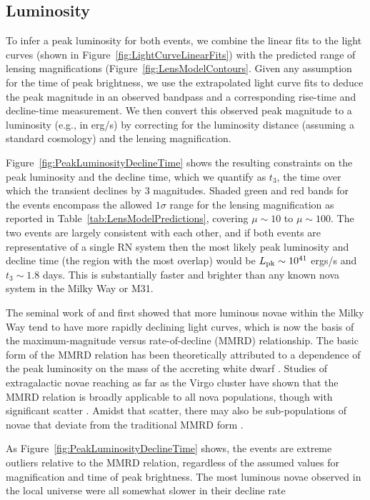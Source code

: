 \subsection{Luminosity}

To infer a peak luminosity for both \spock events, we combine the
linear fits to the light curves (shown in
Figure~\ref{fig:LightCurveLinearFits}) with the predicted range of
lensing magnifications (Figure~\ref{fig:LensModelContours}. Given any
assumption for the time of peak brightness, we use the extrapolated
light curve fits to deduce the peak magnitude in an observed bandpass
and a corresponding rise-time and decline-time measurement.  We then
convert this observed peak magnitude to a luminosity (e.g., in
erg/s) by correcting for the luminosity distance (assuming a standard
\LCDM cosmology) and the lensing magnification.

Figure~\ref{fig:PeakLuminosityDeclineTime} shows the resulting
constraints on the peak luminosity and the decline time, which we
quantify as $t_3$, the time over which the transient declines by 3
magnitudes.  Shaded green and red bands for the \spock events
encompass the allowed $1\sigma$ range for the lensing magnification as
reported in Table~\ref{tab:LensModelPredictions}, covering $\mu\sim10$
to $\mu\sim100$.  The two events are largely consistent with each
other, and if both events are representative of a single RN system
then the most likely peak luminosity and decline time (the region with
the most overlap) would be $L_{\rm pk}\sim10^{41}$ ergs/s and
$t_3\sim1.8$ days.  This is substantially faster and brighter than any
known nova system in the Milky Way or M31. 

The seminal work of \citet{Zwicky:1936} and \citet{McLaughlin:1939}
first showed that more luminous novae within the Milky Way tend to
have more rapidly declining light curves, which is now the basis of
the maximum-magnitude versus rate-of-decline (MMRD) relationship. The
basic form of the MMRD relation has been theoretically attributed to a
dependence of the peak luminosity on the mass of the accreting white
dwarf \citep[e.g.][]{Livio:1992}.  Studies of extragalactic novae
reaching as far as the Virgo cluster have shown that the MMRD relation
is broadly applicable to all nova populations, though with significant
scatter
\citep[e.g.][]{Ciardullo:1990,DellaValle:1995,Ferrarese:2003,Shafter:2011}.
Amidst that scatter, there may also be sub-populations of novae that
deviate from the traditional MMRD form \citep{Kasliwal:2011}.

As Figure~\ref{fig:PeakLuminosityDeclineTime} shows, the \spock events
are extreme outliers relative to the MMRD relation, regardless of the
assumed values for magnification and time of peak brightness. The most luminous novae observed in the local universe were all somewhat slower in their decline rate 

